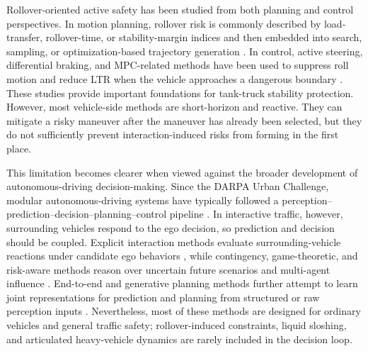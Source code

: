 Rollover-oriented active safety has been studied from both planning and control perspectives. In motion planning, rollover risk is commonly described by load-transfer, rollover-time, or stability-margin indices and then embedded into search, sampling, or optimization-based trajectory generation \cite{jin2021heavytruck,rasekhipour2017pfmpc,li2019rollover}. In control, active steering, differential braking, and MPC-related methods have been used to suppress roll motion and reduce LTR when the vehicle approaches a dangerous boundary \cite{zhao2019hinfty,Reviewer2_SunWencai2022,weixing2023_antirollover}. These studies provide important foundations for tank-truck stability protection. However, most vehicle-side methods are short-horizon and reactive. They can mitigate a risky maneuver after the maneuver has already been selected, but they do not sufficiently prevent interaction-induced risks from forming in the first place.

This limitation becomes clearer when viewed against the broader development of autonomous-driving decision-making. Since the DARPA Urban Challenge, modular autonomous-driving systems have typically followed a perception--prediction--decision--planning--control pipeline \cite{ferguson2008urban}. In interactive traffic, however, surrounding vehicles respond to the ego decision, so prediction and decision should be coupled. Explicit interaction methods evaluate surrounding-vehicle reactions under candidate ego behaviors \cite{cunningham2015mpdm,ding2022epsilon}, while contingency, game-theoretic, and risk-aware methods reason over uncertain future scenarios and multi-agent influence \cite{da2022reactivesafety,li2020gametheorytits,li2023marc}. End-to-end and generative planning methods further attempt to learn joint representations for prediction and planning from structured or raw perception inputs \cite{hu2022uniAD,DiffusionPlanner2025}. Nevertheless, most of these methods are designed for ordinary vehicles and general traffic safety; rollover-induced constraints, liquid sloshing, and articulated heavy-vehicle dynamics are rarely included in the decision loop.

